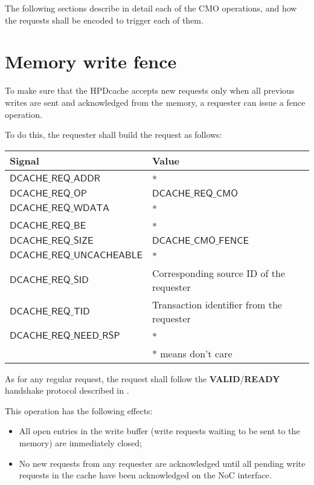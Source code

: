 \documentclass[10pt,titlepage,twoside]{book}
\begin{document}
The following sections describe in detail each of the \ac{CMO} operations, and how the requests shall be encoded to trigger each of them.


\newpage
\section{Memory write fence}

To make sure that the \ac{HPDcache} accepts new requests only when all previous writes are sent and acknowledged from the memory, a requester can issue a fence operation.

To do this, the requester shall build the request as follows:

{\centering\footnotesize\begin{tabular}{p{.38\linewidth}p{.55\linewidth}}
  \toprule
  \textbf{Signal}
  & \textbf{Value} \\
  \midrule
  $\mathsf{DCACHE\_REQ\_ADDR}$
  & *\\
  \midrule
  $\mathsf{DCACHE\_REQ\_OP}$
  & $\mathsf{DCACHE\_REQ\_CMO}$ \\
  \midrule
  $\mathsf{DCACHE\_REQ\_WDATA}$
  & *\\
  \midrule
  $\mathsf{DCACHE\_REQ\_BE}$
  & *\\
  \midrule
  $\mathsf{DCACHE\_REQ\_SIZE}$
  & $\mathsf{DCACHE\_CMO\_FENCE}$ \\
  \midrule
  $\mathsf{DCACHE\_REQ\_UNCACHEABLE}$
  & *\\
  \midrule
  $\mathsf{DCACHE\_REQ\_SID}$
  & Corresponding source ID of the requester\\
  \midrule
  $\mathsf{DCACHE\_REQ\_TID}$
  & Transaction identifier from the requester\\
  \midrule
  $\mathsf{DCACHE\_REQ\_NEED\_RSP}$
  & *\\
  \bottomrule
  & * means don't care \\
\end{tabular}}

As for any regular request, the request shall follow the \textbf{VALID}/\textbf{READY} handshake protocol described in .

This operation has the following effects:
\begin{itemize}
\item All open entries in the write buffer (write requests waiting to be sent to the memory) are immediately closed;
\item No new requests from any requester are acknowledged until all pending write requests in the cache have been acknowledged on the \ac{NoC} interface.
\end{itemize}
\end{document}
